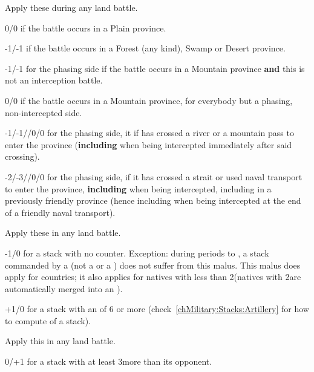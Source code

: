  Apply these during any land battle.
\begin{modlist}
\item[0/0] if the battle occurs in a Plain province.
\item[-1/-1] if the battle occurs in a Forest (any kind), Swamp or
  Desert province.
\item[-1/-1] for the phasing side if the battle occurs in a Mountain
  province \textbf{and} this is not an interception battle.
\item[0/0] if the battle occurs in a Mountain province, for everybody but
  a phasing, non-intercepted side.
\item[-1/-1//0/0] for the phasing side, it if has crossed a river or a
  mountain pass to enter the province (\textbf{including} when being
  intercepted immediately after said crossing).
\item[-2/-3//0/0] for the phasing side, if it has crossed a strait or used
  naval transport to enter the province, \textbf{including} when being
  intercepted, including in a previously friendly province (hence including
  when being intercepted at the end of a friendly naval transport).
\end{modlist}

 Apply these in any land battle.
\begin{modlist}
\item[-1/0] for a stack with no \ARMY counter. Exception: during periods
   to , a stack commanded by a \LeaderC (not a \LeaderGov
  or a \LeaderE) does not suffer from this malus. This malus does apply for
  \ROTW countries; it also applies for natives with less than 2\LD (natives
  with 2\LD are automatically merged into an \ARMY\Facemoins).
\item[+1/0] for a stack with an  of 6 or more
  (check~\ref{chMilitary:Stacks:Artillery} for how to compute  of a stack).
\end{modlist}

 Apply this in any land battle.
\begin{modlist}
\item[0/+1] for a stack with at least 3\LD more than its opponent.
\end{modlist}

